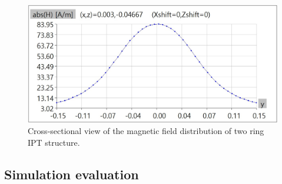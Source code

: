 \begin{figure}[htbp]
    \centering
    \includegraphics[width=0.9\linewidth]{images/4_two_ring_near_field_distribution_cut.JPG}
    \caption{Cross-sectional view of the magnetic field distribution of two ring IPT structure.}
\end{figure}


\subsection{Simulation evaluation}


